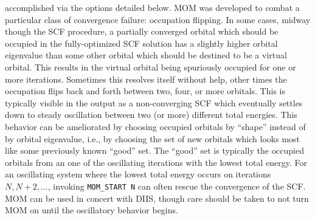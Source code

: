accomplished via the options detailed below. MOM was developed to combat a
particular class of convergence failure: occupation flipping. In some cases,
midway though the SCF procedure, a partially converged orbital which should be
occupied in the fully-optimized SCF solution has a slightly higher orbital
eigenvalue than some other orbital which should be destined to be a virtual
orbital. This results in the virtual orbital being spuriously occupied for one
or more iterations. Sometimes this resolves itself without help, other times the
occupation flips back and forth between two, four, or more orbitals. This is
typically visible in the output as a non-converging SCF which eventually settles
down to steady oscillation between two (or more) different total energies. This
behavior can be ameliorated by choosing occupied orbitals by ``shape'' instead
of by orbital eigenvalue, i.e., by choosing the set of new orbitals which looks
most like some previously known ``good'' set.  The ``good'' set is typically the
occupied orbitals from an one of the oscillating iterations with the lowest
total energy. For an oscillating system where the lowest total energy occurs on
iterations $N,N+2,\ldots$, invoking \texttt{MOM_START N} can often rescue the
convergence of the SCF. MOM can be used in concert with DIIS, though care should
be taken to not turn MOM on until the oscillatory behavior begins. 



